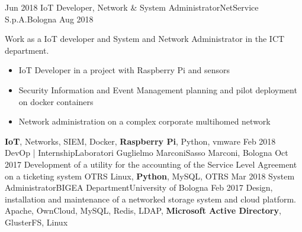 %
%
%

\begin{experiences}
  \experience
  {Jun 2018} {IoT Developer, Network \& System Administrator}{NetService S.p.A.}{Bologna}
  {Aug 2018}    {
                    Work as a IoT developer and System and Network Administrator in the ICT department.
                    \begin{itemize}
                      \item IoT Developer in a project with Raspberry Pi and sensors
                      \item Security Information and Event Management planning and pilot deployment on docker containers
                      \item Network administration on a complex corporate multihomed network 
                    \end{itemize}
                  }
                  {\textbf{IoT}, Networks, SIEM, Docker, \textbf{Raspberry Pi}, Python, vmware}
\emptySeparator
  \experience
    {Feb 2018} {DevOp | Internship}{Laboratori Guglielmo Marconi}{Sasso Marconi, Bologna}
    {Oct 2017}    {
                      Development of a utility for the accounting of the Service Level Agreement on a ticketing system OTRS
                    }
                    {Linux, \textbf{Python}, MySQL, OTRS}
  \emptySeparator
  \experience
    {Mar 2018}   {System Administrator}{BIGEA Department}{University of Bologna}
    {Feb 2017} {
                    Design, installation and maintenance of a networked storage system and cloud platform.
                    }
                    {Apache, OwnCloud, MySQL, Redis, LDAP, \textbf{Microsoft Active Directory}, GlusterFS, Linux}
\emptySeparator
\end{experiences}
